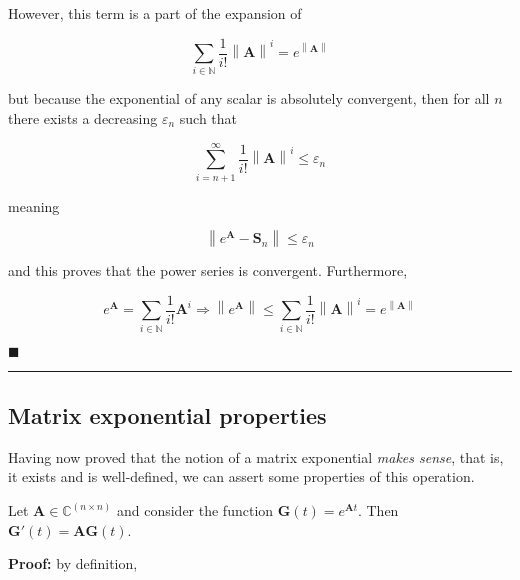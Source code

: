 	However, this term is a part of the expansion of

\begin{equation} \sum\limits_{i\in\mathbb{N}} \dfrac{1}{i!} \left\lVert \mathbf{A} \right\rVert^i = e^{\left\lVert \mathbf{A}\right\rVert} \end{equation}

	\noindent but because the exponential of any scalar is absolutely convergent, then for all $n$ there exists a decreasing $\varepsilon_n$ such that

\begin{equation} \sum\limits_{i=n+1}^\infty \dfrac{1}{i!} \left\lVert \mathbf{A} \right\rVert^i \leq \varepsilon_n \end{equation}

	\noindent meaning

\begin{equation} \left\lVert e^{\mathbf{A}} - \mathbf{S}_n\right\rVert \leq \varepsilon_n \end{equation}

	\noindent and this proves that the power series is convergent. Furthermore,

\begin{equation} e^{\mathbf{A}} = \sum\limits_{i\in\mathbb{N}} \dfrac{1}{i!} \mathbf{A}^i \Rightarrow \left\lVert e^{\mathbf{A}} \right\rVert \leq \sum\limits_{i\in\mathbb{N}} \dfrac{1}{i!} \left\lVert\mathbf{A}\right\rVert^i = e^{\left\lVert \mathbf{A}\right\rVert}\end{equation}

\hfill$\blacksquare$
\vspace{5mm}
\hrule
\vspace{5mm} %

\subsection{Matrix exponential properties} %

	Having now proved that the notion of a matrix exponential \textit{makes sense}, that is, it exists and is well-defined, we can assert some properties of this operation.

\begin{theorem}
	Let $\mathbf{A}\in\mathbb{C}^{(n\times n)}$ and consider the function $\mathbf{G}(t) = e^{\mathbf{A}t}$. Then $\mathbf{G}'(t) = \mathbf{AG}(t)$.
\end{theorem}
\noindent\textbf{Proof:} by definition,

